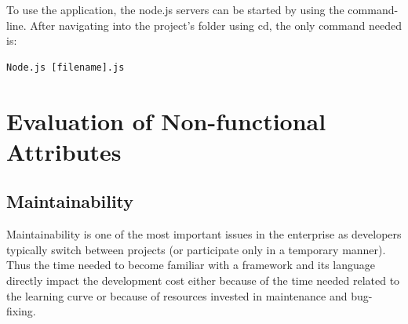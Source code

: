 To use the application, the node.js servers can be started by using the command-line. After navigating
into the project’s folder using cd, the only command needed is:
\begin{lstlisting}[caption={Executing Node.js code}]
Node.js [filename].js
\end{lstlisting}

\newpage
\section{Evaluation of Non-functional Attributes}
\label{evaluation_nonfunctional}

\subsection{Maintainability}
\label{maintainability}
Maintainability is one of the most important issues in the enterprise as
developers typically switch between projects (or participate only in a temporary
manner). Thus the time needed to become familiar with a framework and its
language directly impact the development cost either because of the time needed
related to the learning curve or because of resources invested in maintenance
and bug-fixing.

